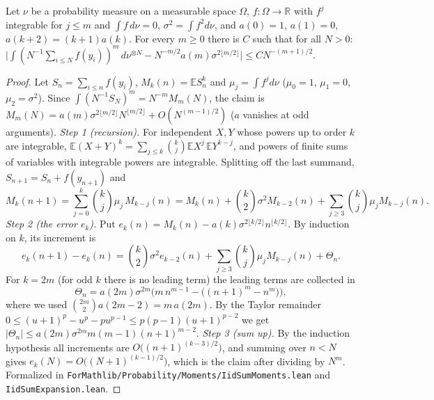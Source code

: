 \begin{theorem}\label{thm:sg-tal:iid-moments}
  \leanok
{}
Let $\nu$ be a probability measure on a measurable space $\Omega$, $f:\Omega\to\mathbb R$ with $f^j$ integrable for $j\le m$ and $\int f\,d\nu=0$, $\sigma^2=\int f^2d\nu$, and $a(0)=1$, $a(1)=0$, $a(k+2)=(k+1)a(k)$. For every $m\ge0$ there is $C$ such that for all $N>0$: $\big|\int(N^{-1}\sum_{i\le N}f(y_i))^m\,d\nu^{\otimes N}-N^{-m/2}a(m)\sigma^{2\lfloor m/2\rfloor}\big|\le CN^{-(m+1)/2}$.
\end{theorem}
\begin{proof}
  \leanok
Let $S_n=\sum_{i\le n}f(y_i)$, $M_k(n)=\mathbb ES_n^k$ and $\mu_j=\int f^jd\nu$ ($\mu_0=1$, $\mu_1=0$, $\mu_2=\sigma^2$). Since $\int(N^{-1}S_N)^m=N^{-m}M_m(N)$, the claim is $M_m(N)=a(m)\sigma^{2\lfloor m/2\rfloor}N^{\lfloor m/2\rfloor}+O(N^{(m-1)/2})$ ($a$ vanishes at odd arguments).
\emph{Step 1 (recursion).} For independent $X,Y$ whose powers up to order $k$ are integrable,
$\mathbb E(X+Y)^k=\sum_{j\le k}\binom kj\mathbb EX^j\,\mathbb EY^{k-j}$, and powers of finite sums of variables with integrable powers are
integrable. Splitting off the last summand, $S_{n+1}=S_n+f(y_{n+1})$ and
\[
M_k(n+1)=\sum_{j=0}^k\binom kj\mu_j\,M_{k-j}(n)=M_k(n)+\binom k2\sigma^2M_{k-2}(n)+\sum_{j\ge3}\binom kj\mu_jM_{k-j}(n).
\]
\emph{Step 2 (the error $e_k$).} Put $e_k(n)=M_k(n)-a(k)\sigma^{2\lfloor k/2\rfloor}n^{\lfloor k/2\rfloor}$. By induction on $k$, its increment is
\[
e_k(n+1)-e_k(n)=\binom k2\sigma^2e_{k-2}(n)+\sum_{j\ge3}\binom kj\mu_jM_{k-j}(n)+\Theta_n .
\]
For $k=2m$ (for odd $k$ there is no leading term) the leading terms are collected in
\[
\Theta_n=a(2m)\sigma^{2m}\Big(m\,n^{m-1}-\big((n+1)^m-n^m\big)\Big),
\]
where we used $\binom{2m}2a(2m-2)=m\,a(2m)$. By the Taylor remainder $0\le(u+1)^p-u^p-pu^{p-1}\le p(p-1)(u+1)^{p-2}$ we get $|\Theta_n|\le a(2m)\sigma^{2m}m(m-1)(n+1)^{m-2}$.
\emph{Step 3 (sum up).} By the induction hypothesis all increments are $O\big((n+1)^{(k-3)/2}\big)$, and summing over $n<N$ gives $e_k(N)=O\big((N+1)^{(k-1)/2}\big)$, which is the claim after dividing by $N^m$.
Formalized in \texttt{ForMathlib/Probability/Moments/IidSumMoments.lean} and \texttt{IidSumExpansion.lean}.
\end{proof}

